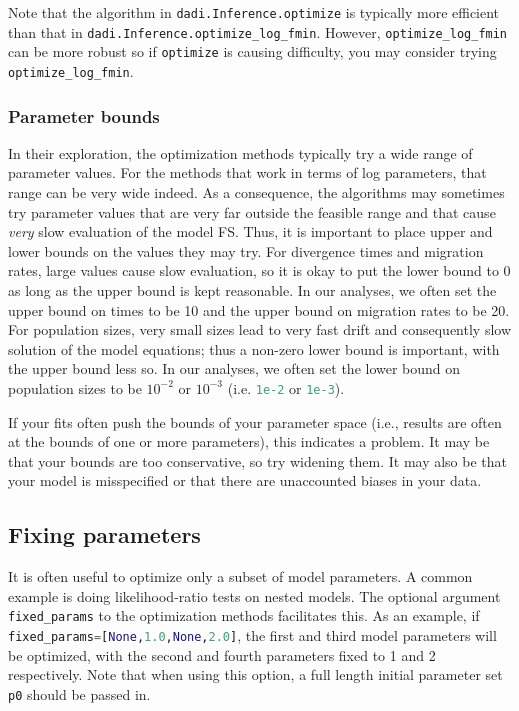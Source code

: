 \documentclass[12pt]{article}
\makeatletter
\newcommand{\py}[1]{\lstinline[language=Python, showstringspaces=False]@#1@}
\makeatother
\begin{document}
Note that the algorithm in \py{dadi.Inference.optimize} is typically more efficient than that in \py{dadi.Inference.optimize_log_fmin}.
However, \py{optimize_log_fmin} can be more robust so if \py{optimize} is causing difficulty, you may consider trying \py{optimize_log_fmin}.

\subsubsection{Parameter bounds}

In their exploration, the optimization methods typically try a wide range of parameter values.
For the methods that work in terms of log parameters, that range can be very wide indeed.
As a consequence, the algorithms may sometimes try parameter values that are very far outside the feasible range and that cause \emph{very} slow evaluation of the model FS.
Thus, it is important to place upper and lower bounds on the values they may try.
For divergence times and migration rates, large values cause slow evaluation, so it is okay to put the lower bound to 0 as long as the upper bound is kept reasonable.
In our analyses, we often set the upper bound on times to be 10 and the upper bound on migration rates to be 20.
For population sizes, very small sizes lead to very fast drift and consequently slow solution of the model equations; thus a non-zero lower bound is important, with the upper bound less so.
In our analyses, we often set the lower bound on population sizes to be $10^{-2}$ or $10^{-3}$ (i.e. \py{1e-2} or \py{1e-3}).

If your fits often push the bounds of your parameter space (i.e., results are often at the bounds of one or more parameters), this indicates a problem.
It may be that your bounds are too conservative, so try widening them.
It may also be that your model is misspecified or that there are unaccounted biases in your data.

\subsection{Fixing parameters}

It is often useful to optimize only a subset of model parameters.
A common example is doing likelihood-ratio tests on nested models.
The optional argument \py{fixed_params} to the optimization methods facilitates this.
As an example, if \py{fixed_params=[None,1.0,None,2.0]}, the first and third model parameters will be optimized, with the second and fourth parameters fixed to 1 and 2 respectively.
Note that when using this option, a full length initial parameter set \py{p0} should be passed in.
\end{document}
